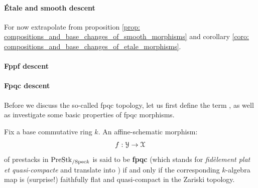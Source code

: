                 \paragraph{\'Etale and smooth descent} \label{paragraph: etale_descent}  
                    \begin{remark} \label{remark: smooth_and_etale_sieves}
                        For now extrapolate from proposition \ref{prop: compositions_and_base_changes_of_smooth_morphisms} and corollary \ref{coro: compositions_and_base_changes_of_etale_morphisms}.
                    \end{remark}
                
                \paragraph{Fppf descent} 
                
                \paragraph{Fpqc descent} 
                    Before we discuss the so-called fpqc topology, let us first define the term , as well as investigate some basic properties of fpqc morphisms.
                    
                    \begin{definition} \label{def: fpqc_morphisms} 
                        Fix a base commutative ring $k$. An affine-schematic morphism:
                            $$f: \mathcal{Y} \to \mathcal{X}$$
                        of prestacks in $\mathrm{Pre}\mathrm{Stk}_{/\mathrm{Spec} k}$ is said to be \textbf{fpqc} (which stands for \textit{fid\`element plat et quasi-compacte} and translate into ) if and only if the corresponding $k$-algebra map is (surprise!) faithfully flat and quasi-compact in the Zariski topology.
                    \end{definition}
                    
